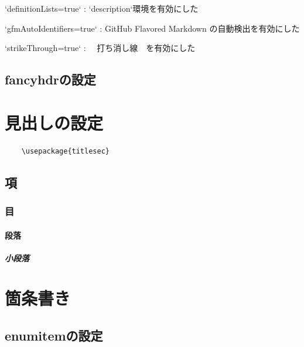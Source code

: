 \documentclass[
    article,
    head_space=25truemm,
    foot_space=10truemm,
    gutter=15truemm]{jlreq}
\begin{document}
\inputminted{latex}{preamble/markdown.tex}

\begin{markdown}
`definitionLists=true`
: `description`環境を有効にした

`gfmAutoIdentifiers=true`
: GitHub Flavored Markdown の自動検出を有効にした

`strikeThrough=true`
: ~~打ち消し線~~を有効にした
\end{markdown}

\subsection{fancyhdrの設定}


\section{見出しの設定}

\begin{verbatim}
    \usepackage{titlesec}
\end{verbatim}


\subsection{項}


\subsubsection{目}


\paragraph{段落}


\subparagraph{小段落}



\section{箇条書き}

\subsection{enumitemの設定}

\inputminted{latex}{./preamble/enumitem.tex}
\end{document}
